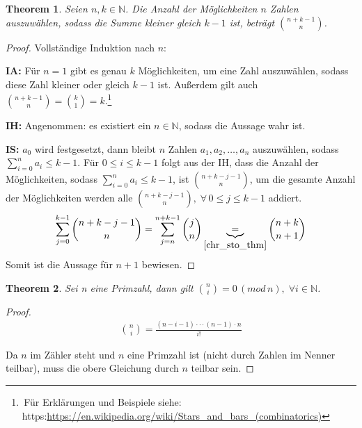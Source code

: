 \documentclass[12pt,oneside]{article}
\newtheorem{theorem}{Theorem}[section]
\theoremstyle{remark}
\theoremstyle{definition}
\begin{document}
\begin{flushleft}
\begin{theorem}\label{number_of_choices}
Seien $n,k \in \mathbb{N}$. Die Anzahl der Möglichkeiten $n$ Zahlen auszuwählen, sodass die Summe kleiner gleich $k - 1$ ist, beträgt ${n + k - 1 \choose n}$.
\end{theorem}

\begin{proof}
Vollständige Induktion nach $n$:

\textbf{IA:} Für $n = 1$ gibt es genau $k$ Möglichkeiten, um eine Zahl auszuwählen, sodass diese Zahl kleiner oder gleich $k - 1$ ist. Außerdem gilt auch ${n + k - 1 \choose n} = {k \choose 1} = k$.\footnote{$\,$Für Erklärungen und Beispiele siehe: https:\url{https://en.wikipedia.org/wiki/Stars_and_bars_(combinatorics)}}\newline  

\textbf{IH:} Angenommen: es existiert ein $n \in \mathbb{N}$, sodass die Aussage wahr ist.\newline

\textbf{IS:} $a_0$ wird festgesetzt, dann bleibt $n$ Zahlen $a_1,a_2, \dots,a_n$ auszuwählen, sodass $\sum_{i = 0}^{n} a_i \leq k - 1$. Für $ 0 \leq i \leq k - 1$ folgt aus der IH, dass die Anzahl der Möglichkeiten, sodass $\sum_{i = 0}^{n} a_i \leq k - 1$, ist ${n + k - j - 1 \choose n}$, um die gesamte Anzahl der Möglichkeiten werden alle ${n + k - j - 1 \choose n}, \; \forall  \, 0 \leq j \leq k - 1 $ addiert.
\begin{align*}
    \sum_{j = 0}^{k - 1}{n + k - j - 1 \choose n} = \sum_{j = n}^{n + k -1} {j \choose n} \underbrace{=}_{\ref{chr_sto_thm}} {n + k \choose n + 1}
\end{align*}
Somit ist die Aussage für $n + 1$ bewiesen. 
\end{proof}

\smallskip


\bigskip

\begin{theorem}\label{th_25}
Sei n eine Primzahl, dann gilt ${n \choose i} = 0 \, ( mod \, n), \; \forall i \in \mathbb{N}$.
\end{theorem}

\begin{proof}
\begin{align*}\label{modb}
    {n \choose i} = \frac{(n - i - 1) \cdot  \cdot  \cdot (n - 1) \cdot n }{i!}
\end{align*}

Da $n$ im Zähler steht und $n$ eine Primzahl ist (nicht durch Zahlen im Nenner teilbar), muss die obere Gleichung  durch $n$ teilbar sein. 
\end{proof}


\end{flushleft}
\end{document}
